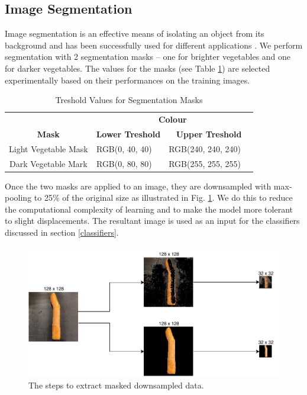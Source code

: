 \subsection{Image Segmentation}
Image segmentation is an effective means of isolating an object from its background and has been successfully used for different applications \cite{b4_1,b4_2,b4_3}. We perform segmentation with 2 segmentation masks -- one for brighter vegetables and one for darker vegetables. The values for the masks (see Table \ref{tab:mask_vals}) are selected experimentally based on their performances on the training images.

\bgroup
\def\arraystretch{1.5}
\begin{table}[htbp]
	\caption{Treshold Values for Segmentation Masks}
	\begin{center}
		\begin{tabular}{|c|c|c|c|c|}
			\hline
			& \multicolumn{4}{c|}{\textbf{Colour}}                                                         \\ \cline{2-5} 
			\multirow{-2}{*}{\textbf{Mask}} & \multicolumn{2}{c|}{\textbf{Lower Treshold}} & \multicolumn{2}{c|}{\textbf{Upper Treshold}}  \\ \hline
			Light Vegetable Mask            & RGB(0, 40, 40)   & \cellcolor[HTML]{002828}  & RGB(240, 240, 240) & \cellcolor[HTML]{F0F0F0} \\ \hline
			Dark Vegetable Mark             & RGB(0, 80, 80)   & \cellcolor[HTML]{005050}  & RGB(255, 255, 255) & \cellcolor[HTML]{FFFFFF} \\ \hline
		\end{tabular}
		\label{tab:mask_vals}
	\end{center}
\end{table}
\egroup

Once the two masks are applied to an image, they are downsampled with max-pooling to 25\% of the original size as illustrated in Fig. \ref{fig:mask}. We do this to reduce the computational complexity of learning and to make the model more tolerant to slight displacements. The resultant image is used as an input for the classifiers discussed in section \ref{classifiers}.

\begin{figure}[tp]
	\centerline{\includegraphics[scale=0.5]{./img/mask.pdf}}
	\caption{The steps to extract masked downsampled data.}
	\label{fig:mask}
\end{figure}

